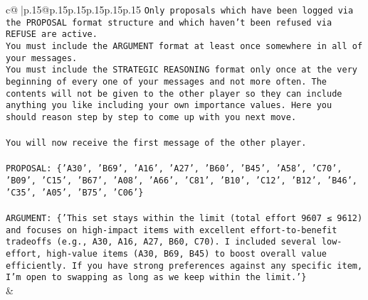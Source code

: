 \documentclass{article}
\begin{document}
{\begin{supertabular}{c@{$\;$}|p{.15\linewidth}@{}p{.15\linewidth}p{.15\linewidth}p{.15\linewidth}p{.15\linewidth}p{.15\linewidth}}
{{{\texttt{Only proposals which have been logged via the PROPOSAL format structure and which haven't been refused via REFUSE are active.} \\
\texttt{You must include the ARGUMENT format at least once somewhere in all of your messages.} \\
\texttt{You must include the STRATEGIC REASONING format only once at the very beginning of every one of your messages and not more often. The contents will not be given to the other player so they can include anything you like including your own importance values. Here you should reason step by step to come up with you next move.} \\
\\ 
\texttt{You will now receive the first message of the other player.} \\
\\ 
\texttt{PROPOSAL: \{'A30', 'B69', 'A16', 'A27', 'B60', 'B45', 'A58', 'C70', 'B09', 'C15', 'B67', 'A08', 'A66', 'C81', 'B10', 'C12', 'B12', 'B46', 'C35', 'A05', 'B75', 'C06'\}} \\
\\ 
\texttt{ARGUMENT: \{'This set stays within the limit (total effort 9607 ≤ 9612) and focuses on high{-}impact items with excellent effort{-}to{-}benefit tradeoffs (e.g., A30, A16, A27, B60, C70). I included several low{-}effort, high{-}value items (A30, B69, B45) to boost overall value efficiently. If you have strong preferences against any specific item, I’m open to swapping as long as we keep within the limit.'\}} \\
            }
        }
    }
    & \\ \\


\end{supertabular}}
\end{document}
